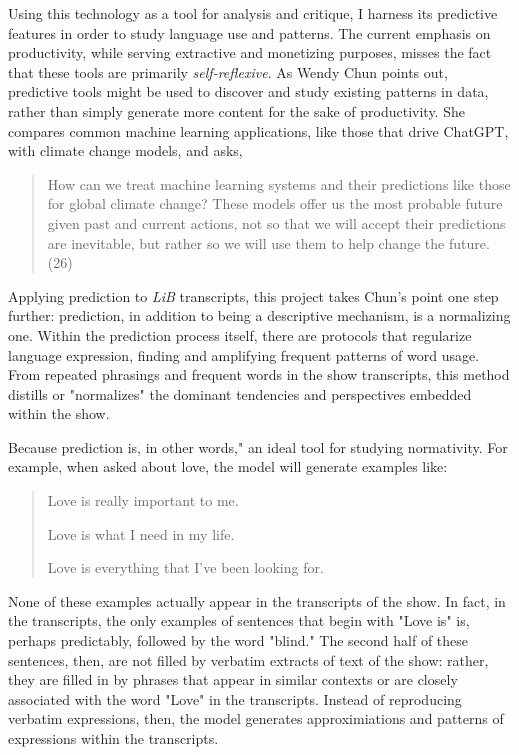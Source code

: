 \documentclass[11pt]{article}
\begin{document}
Using this technology as a tool for analysis and critique, I harness
its predictive features in order to study language use and patterns.
The current emphasis on productivity, while serving extractive and
monetizing purposes, misses the fact that these tools are primarily
\emph{self-reflexive}. As Wendy Chun points out, predictive tools might be
used to discover and study existing patterns in data, rather than
simply generate more content for the sake of productivity. She
compares common machine learning applications, like those that drive
ChatGPT, with climate change models, and asks,
\begin{quote}
How can we treat machine learning systems and their predictions like
those for global climate change? These models offer us the most
probable future given past and current actions, not so that we will
accept their predictions are inevitable, but rather so we will use
them to help change the future. (26)
\end{quote}
Applying prediction to \emph{LiB} transcripts, this project takes Chun's
point one step further: prediction, in addition to being a descriptive
mechanism, is a normalizing one. Within the prediction process itself,
there are protocols that regularize language expression, finding and
amplifying frequent patterns of word usage. From repeated phrasings
and frequent words in the show transcripts, this method distills or
"normalizes" the dominant tendencies and perspectives embedded within
the show.

Because prediction is, in other words," an ideal tool for studying
normativity. For example, when asked about love, the model will
generate examples like:
\begin{quote}
Love is really important to me.

Love is what I need in my life.

Love is everything that I've been looking for.
\end{quote}
None of these examples actually appear in the transcripts of the show.
In fact, in the transcripts, the only examples of sentences that begin
with "Love is" is, perhaps predictably, followed by the word "blind."
The second half of these sentences, then, are not filled by verbatim
extracts of text of the show: rather, they are filled in by phrases
that appear in similar contexts or are closely associated with the
word "Love" in the transcripts. Instead of reproducing verbatim
expressions, then, the model generates approximiations and patterns of
expressions within the transcripts.
\end{document}
